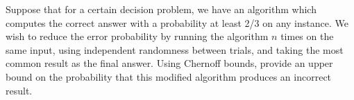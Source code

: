 \problem{}
Suppose that for a certain decision problem, we have an algorithm which computes the correct answer with a probability  at least 2/3 on any instance.  We wish to reduce the error probability by running the algorithm $n$ times on the same input, using independent randomness between trials, and taking the most common result as the final answer. Using Chernoff bounds, provide an upper bound on the probability that this modified algorithm produces an incorrect result.

\solution{}








\newpage